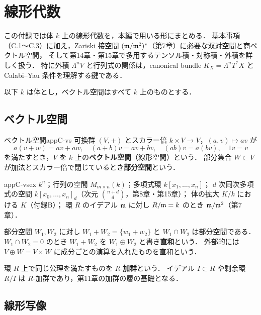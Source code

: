 \chapter{線形代数}\label{app:C}

この付録では体 $k$ 上の線形代数を，本編で用いる形にまとめる．
基本事項（C.1〜C.3）に加え，Zariski 接空間 $(\mathfrak{m}/\mathfrak{m}^2)^*$（第7章）に必要な双対空間と商ベクトル空間，
そして第14章・第15章で多用するテンソル積・対称積・外積を詳しく扱う．
特に外積 $\Lambda^nV$ と行列式の関係は，canonical bundle $K_X=\Lambda^nT^*X$ と
Calabi–Yau 条件を理解する鍵である．

以下 $k$ は体とし，ベクトル空間はすべて $k$ 上のものとする．

\section{ベクトル空間}

\begin{mydef}{ベクトル空間}{appC-vs}
可換群 $(V,+)$ とスカラー倍 $k\times V\to V$，$(a,v)\mapsto av$ が
\[
a(v+w)=av+aw,\quad (a+b)v=av+bv,\quad (ab)v=a(bv),\quad 1v=v
\]
を満たすとき，$V$ を $k$ 上の\textbf{ベクトル空間}（線形空間）という．
部分集合 $W\subset V$ が加法とスカラー倍で閉じているとき\textbf{部分空間}という．
\end{mydef}

\begin{myex}{}{appC-vsex}
$k^n$；行列の空間 $M_{m\times n}(k)$；多項式環 $k[x_1,\dots,x_n]$；
$d$ 次同次多項式の空間 $k[x_0,\dots,x_n]_d$（次元 $\binom{n+d}{d}$，第8章・第15章）；
体の拡大 $K/k$ における $K$（付録B）；
環 $R$ のイデアル $\mathfrak{m}$ に対し $R/\mathfrak{m}=k$ のとき $\mathfrak{m}/\mathfrak{m}^2$（第7章）．
\end{myex}

部分空間 $W_1,W_2$ に対し $W_1+W_2=\{w_1+w_2\}$ と $W_1\cap W_2$ は部分空間である．
$W_1\cap W_2=0$ のとき $W_1+W_2$ を $W_1\oplus W_2$ と書き\textbf{直和}という．
外部的には $V\oplus W=V\times W$ に成分ごとの演算を入れたものを直和という．

環 $R$ 上で同じ公理を満たすものを $R$-\textbf{加群}という．
イデアル $I\subset R$ や剰余環 $R/I$ は $R$-加群であり，第11章の加群の層の基礎となる．

\section{線形写像}

